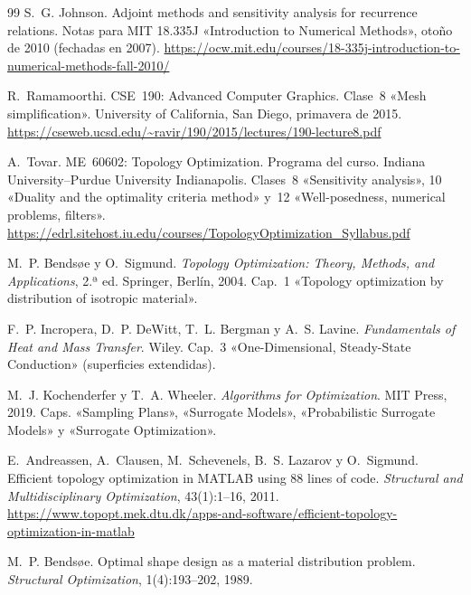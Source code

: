 \begin{thebibliography}{99}
S.~G. Johnson.
\newblock Adjoint methods and sensitivity analysis for recurrence relations.
\newblock Notas para MIT 18.335J «Introduction to Numerical Methods», otoño de 2010 (fechadas en 2007).
\newblock \url{https://ocw.mit.edu/courses/18-335j-introduction-to-numerical-methods-fall-2010/}

R.~Ramamoorthi.
\newblock CSE~190: Advanced Computer Graphics. Clase~8 «Mesh simplification».
\newblock University of California, San Diego, primavera de 2015.
\newblock \url{https://cseweb.ucsd.edu/~ravir/190/2015/lectures/190-lecture8.pdf}

A.~Tovar.
\newblock ME~60602: Topology Optimization. Programa del curso.
\newblock Indiana University--Purdue University Indianapolis. Clases~8 «Sensitivity analysis», 10 «Duality and the optimality criteria method» y~12 «Well-posedness, numerical problems, filters».
\newblock \url{https://edrl.sitehost.iu.edu/courses/TopologyOptimization_Syllabus.pdf}

M.~P. Bendsøe y O.~Sigmund.
\newblock \emph{Topology Optimization: Theory, Methods, and Applications}, 2.ª ed.
\newblock Springer, Berlín, 2004. Cap.~1 «Topology optimization by distribution of isotropic material».

F.~P. Incropera, D.~P. DeWitt, T.~L. Bergman y A.~S. Lavine.
\newblock \emph{Fundamentals of Heat and Mass Transfer}.
\newblock Wiley. Cap.~3 «One-Dimensional, Steady-State Conduction» (superficies extendidas).

M.~J. Kochenderfer y T.~A. Wheeler.
\newblock \emph{Algorithms for Optimization}.
\newblock MIT Press, 2019. Caps. «Sampling Plans», «Surrogate Models», «Probabilistic Surrogate Models» y «Surrogate Optimization».

E.~Andreassen, A.~Clausen, M.~Schevenels, B.~S. Lazarov y O.~Sigmund.
\newblock Efficient topology optimization in MATLAB using 88 lines of code.
\newblock \emph{Structural and Multidisciplinary Optimization}, 43(1):1--16, 2011.
\newblock \url{https://www.topopt.mek.dtu.dk/apps-and-software/efficient-topology-optimization-in-matlab}

M.~P. Bendsøe.
\newblock Optimal shape design as a material distribution problem.
\newblock \emph{Structural Optimization}, 1(4):193--202, 1989.


\end{thebibliography}

